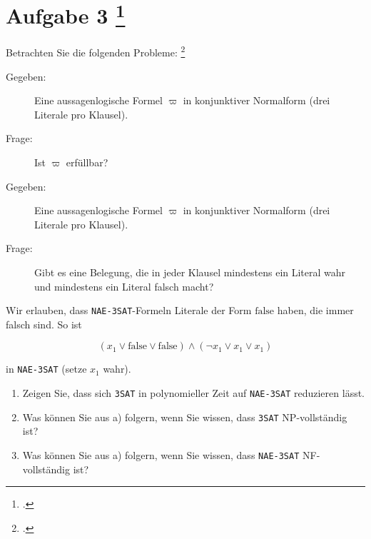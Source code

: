 \documentclass{lehramt-informatik-aufgabe}
\begin{document}
\liAufgabenTitel{}
\section{Aufgabe 3
\footcite{66115:2017:09}}


Betrachten Sie die folgenden Probleme:
\footcite[Aufgabe 15: StEx F2016 T2 A3, StEx H2017 T1 A3 (Check-Up)]{theo:ab:4}

%


\begin{description}
\item[Gegeben:]

Eine aussagenlogische Formel $\varpi$ in konjunktiver Normalform (drei
Literale pro Klausel).

\item[Frage:]

Ist $\varpi$ erfüllbar?
\end{description}

%


\begin{description}
\item[Gegeben:]

Eine aussagenlogische Formel $\varpi$ in konjunktiver Normalform
(drei Literale pro Klausel).

\item[Frage:]

Gibt es eine Belegung, die in jeder Klausel mindestens ein Literal wahr
und mindestens ein Literal falsch macht?

\end{description}

Wir erlauben, dass \texttt{NAE-3SAT}-Formeln Literale der Form
$\text{false}$ haben, die immer falsch sind. So ist

\begin{displaymath}
(x_1 \lor \text{false} \lor \text{false})
\land
(\neg x_1 \lor x_1 \lor x_1)
\end{displaymath}

in \texttt{NAE-3SAT} (setze $x_1$ wahr).
\begin{enumerate}


\item Zeigen Sie, dass sich \texttt{3SAT} in polynomieller Zeit auf
\texttt{NAE-3SAT} reduzieren lässt.


\item Was können Sie aus a) folgern, wenn Sie wissen, dass \texttt{3SAT}
NP-vollständig ist?


\item Was können Sie aus a) folgern, wenn Sie wissen, dass
\texttt{NAE-3SAT} NF-vollständig ist?

\end{enumerate}
\end{document}
